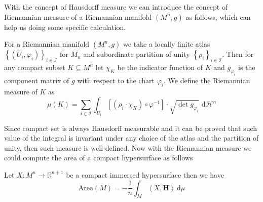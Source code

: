 With the concept of Hausdorff measure we can introduce the concept of Riemannian measure of a Riemannian manifold $(M^n,g)$ as follows, which can help us doing some specific calculation.

\begin{definition}\label{def:Riemannian Measure}
    For a Riemannian manifold $(M^n,g)$ we take a locally finite atlas ${\left\{(U_i,\varphi_i)\right\}}_{i\in\mathcal{I}}$ for $M_n$ and subordinate partition of unity ${\left\{\rho_i\right\}}_{i\in\mathcal{I}}$. Then for any compact subset $K\subseteq M^n$ let $\chi_K$ be the indicator function of $K$ and $g_{\varphi_i}$ is the component matrix of $g$ with respect to the chart $\varphi_i$. We define the Riemannian measure of $K$ as
    \begin{equation}
        \mu(K)=\sum_{i\in\mathcal{I}}\int_{U_i}\left[\left(\rho_i\cdot\chi_K\right)\circ\varphi^{-1}\right]\cdot\sqrt{\det{g_{\varphi_i}}}\,\,\mathrm{d}\mathscr{H}^n
    \end{equation}
\end{definition}

Since compact set is always Hausdorff measurable and it can be proved that such value of the integral is invariant under any choice of the atlas and the partition of unity, then such measure is well-defined. Now with the Riemannian measure we could compute the area of a compact hypersurface as follows
\begin{lemma}\label{lem:H-2-1}
    Let $X:M^n\to\mathbb{R}^{n+1}$ be a compact immersed hypersurface then we have
    \begin{equation}\label{eq:H-2-1}
        \mathrm{Area}(M)=-\frac{1}{n}\int_M\left<X,\boldsymbol{H}\right>\, \mathrm{d}\mu
    \end{equation}
\end{lemma}

